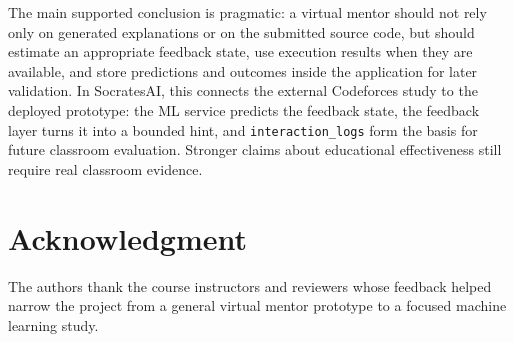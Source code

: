 \documentclass[conference]{IEEEtran}
\begin{document}
The main supported conclusion is pragmatic: a virtual mentor should not rely only on generated explanations or on the submitted source code, but should estimate an appropriate feedback state, use execution results when they are available, and store predictions and outcomes inside the application for later validation. In SocratesAI, this connects the external Codeforces study to the deployed prototype: the ML service predicts the feedback state, the feedback layer turns it into a bounded hint, and \texttt{interaction\_logs} form the basis for future classroom evaluation. Stronger claims about educational effectiveness still require real classroom evidence.

\section*{Acknowledgment}

The authors thank the course instructors and reviewers whose feedback helped narrow the project from a general virtual mentor prototype to a focused machine learning study.
\end{document}
